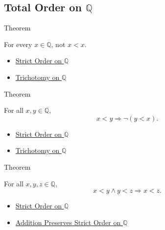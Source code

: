 \subsection*{Total Order on $\mathbb{Q}$}

\begin{theorembox}{Theorem}
\begin{theorem}
\label{thm:strict-order-on-q-irreflexive}
For every $x\in\mathbb{Q}$, not $x<x$.
\end{theorem}
\end{theorembox}

\begin{dependencies}
\begin{itemize}
  \item \hyperref[def:strict-order-on-q]{Strict Order on $\mathbb{Q}$}
  \item \hyperref[thm:trichotomy-on-q]{Trichotomy on $\mathbb{Q}$}
\end{itemize}
\end{dependencies}

\begin{theorembox}{Theorem}
\begin{theorem}
\label{thm:strict-order-on-q-asymmetric}
For all $x,y\in\mathbb{Q}$,
\[
x<y \Longrightarrow \neg(y<x).
\]
\end{theorem}
\end{theorembox}

\begin{dependencies}
\begin{itemize}
  \item \hyperref[def:strict-order-on-q]{Strict Order on $\mathbb{Q}$}
  \item \hyperref[thm:trichotomy-on-q]{Trichotomy on $\mathbb{Q}$}
\end{itemize}
\end{dependencies}

\begin{theorembox}{Theorem}
\begin{theorem}
\label{thm:strict-order-on-q-transitive}
For all $x,y,z\in\mathbb{Q}$,
\[
x<y\land y<z \Longrightarrow x<z.
\]
\end{theorem}
\end{theorembox}

\begin{dependencies}
\begin{itemize}
  \item \hyperref[def:strict-order-on-q]{Strict Order on $\mathbb{Q}$}
  \item \hyperref[thm:addition-preserves-strict-order-on-q]{Addition Preserves Strict Order on $\mathbb{Q}$}
\end{itemize}
\end{dependencies}

